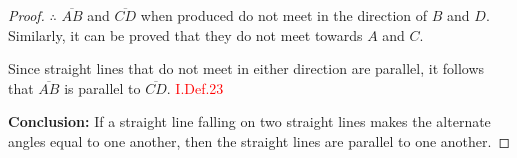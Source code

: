 \begin{proof}
\item[$\therefore$] $\overline{AB}$ and $\overline{CD}$ when produced do not meet in the direction of $B$ and $D$. Similarly, it can be proved that they do not meet towards $A$ and $C$.

Since straight lines that do not meet in either direction are parallel, it follows that $\overline{AB}$ is parallel to $\overline{CD}$. \hfill\textcolor{red}{I.Def.23}

\textbf{Conclusion:} If a straight line falling on two straight lines makes the alternate angles equal to one another, then the straight lines are parallel to one another. 

\end{proof}

\clearpage

